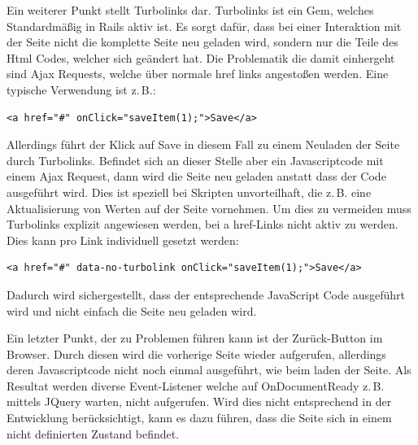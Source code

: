Ein weiterer Punkt stellt Turbolinks dar. Turbolinks ist ein Gem, welches Standardmäßig in Rails aktiv ist. Es sorgt dafür, dass bei einer Interaktion mit der Seite nicht die komplette Seite neu geladen wird, sondern nur die Teile des Html Codes, welcher sich geändert hat.\cite{Gamble.2013} Die Problematik die damit einhergeht sind Ajax Requests, welche über normale href links angestoßen werden. Eine typische Verwendung ist z.\,B.:
\\
\lstset{
   language=Html
}

\begin{lstlisting}[caption=a href HTML Code, label=code:ch5:html01]
<a href="#" onClick="saveItem(1);">Save</a>
\end{lstlisting}

Allerdings führt der Klick auf \glqq Save\grqq{} in diesem Fall zu einem Neuladen der Seite durch Turbolinks. Befindet sich an dieser Stelle aber ein Javascriptcode mit einem Ajax Request, dann wird die Seite neu geladen anstatt dass der Code ausgeführt wird. Dies ist speziell bei Skripten unvorteilhaft, die z.\,B. eine Aktualisierung von Werten auf der Seite vornehmen.
Um dies zu vermeiden muss Turbolinks explizit angewiesen werden, bei \glqq a href\grqq{}-Links nicht aktiv zu werden. Dies kann pro Link individuell gesetzt werden:
\\
\begin{lstlisting}[caption=a href HTML Code - Turbolinks deaktiviert, label=code:ch5:html02]
<a href="#" data-no-turbolink onClick="saveItem(1);">Save</a>
\end{lstlisting}

Dadurch wird sichergestellt, dass der entsprechende JavaScript Code ausgeführt wird und nicht einfach die Seite neu geladen wird.

Ein letzter Punkt, der zu Problemen führen kann ist der \glqq Zurück\grqq{}-Button im Browser.
Durch diesen wird die vorherige Seite wieder aufgerufen, allerdings deren Javascriptcode nicht noch einmal ausgeführt, wie beim laden der Seite. Als Resultat werden diverse Event-Listener welche auf \glqq OnDocumentReady\grqq{} z.\,B. mittels JQuery warten, nicht aufgerufen. Wird dies nicht entsprechend in der Entwicklung berücksichtigt, kann es dazu führen, dass die Seite sich in einem nicht definierten Zustand befindet.
